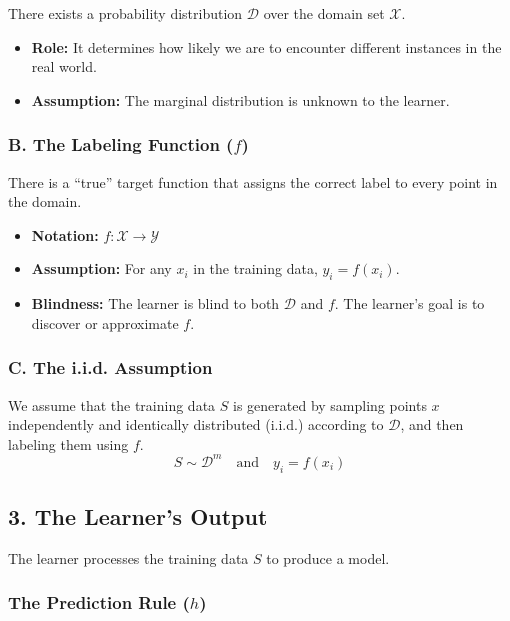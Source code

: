 \documentclass[
  italian,
  11pt,
]{article}
\providecommand{\tightlist}{%
  \setlength{\itemsep}{0pt}\setlength{\parskip}{0pt}}
\begin{document}
There exists a probability distribution \(\mathcal{D}\) over the domain
set \(\mathcal{X}\).

\begin{itemize}
\tightlist
\item
  \textbf{Role:} It determines how likely we are to encounter different
  instances in the real world.
\item
  \textbf{Assumption:} The marginal distribution is unknown to the
  learner.
\end{itemize}

\subsubsection{\texorpdfstring{B. The Labeling Function
(\(f\))}{B. The Labeling Function (f)}}\label{b.-the-labeling-function-f}

There is a ``true'' target function that assigns the correct label to
every point in the domain.

\begin{itemize}
\tightlist
\item
  \textbf{Notation:} \(f: \mathcal{X} \to \mathcal{Y}\)
\item
  \textbf{Assumption:} For any \(x_i\) in the training data,
  \(y_i = f(x_i)\).
\item
  \textbf{Blindness:} The learner is blind to both \(\mathcal{D}\) and
  \(f\). The learner's goal is to discover or approximate \(f\).
\end{itemize}

\subsubsection{C. The i.i.d. Assumption}\label{c.-the-i.i.d.-assumption}

We assume that the training data \(S\) is generated by sampling points
\(x\) independently and identically distributed (i.i.d.) according to
\(\mathcal{D}\), and then labeling them using \(f\).
\[ S \sim \mathcal{D}^m \quad \text{and} \quad y_i = f(x_i) \]

\subsection{3. The Learner's Output}\label{the-learners-output}

The learner processes the training data \(S\) to produce a model.

\subsubsection{\texorpdfstring{The Prediction Rule
(\(h\))}{The Prediction Rule (h)}}\label{the-prediction-rule-h}
\end{document}
